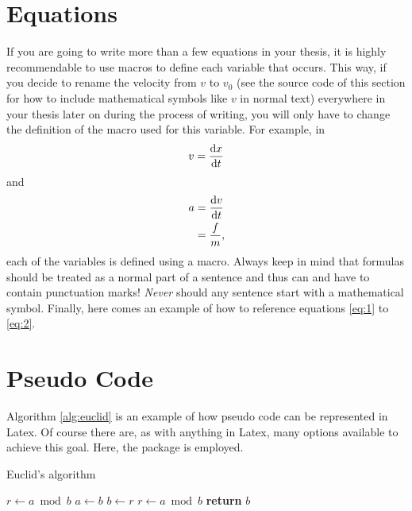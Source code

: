 \section{Equations}
If you are going to write more than a few equations in your thesis, it is highly recommendable to use macros to define each variable that occurs.
This way, if you decide to rename the velocity from $v$ to $v_0$ (see the source code of this section for how to include mathematical symbols like $v$ in normal text) everywhere in your thesis later on during the process of writing, you will only have to change the definition of the macro used for this variable.
For example, in
\begin{equation}
  \label{eq:1}
  v = \frac{\mathrm{d} x}{\mathrm{d} t}
\end{equation}
and
\begin{align}
  \label{eq:2}
  a &= \frac{\mathrm{d} v}{\mathrm{d} t} \nonumber \\
  &= \frac{f}{m},
\end{align}
each of the variables is defined using a macro.
Always keep in mind that formulas should be treated as a normal part of a sentence and thus can and have to contain punctuation marks!
\emph{Never} should any sentence start with a mathematical symbol.
Finally, here comes an example of how to reference equations \eqref{eq:1} to \eqref{eq:2}.

\section{Pseudo Code}
Algorithm \ref{alg:euclid} is an example of how pseudo code can be represented in Latex.
Of course there are, as with anything in Latex, many options available to achieve this goal.
Here, the  package is employed.
\begin{algorithm}
    \caption{Euclid's algorithm}
    \label{alg:euclid}
    \begin{algorithmic}[1] %
         
            \State $r\gets a \bmod b$
             
                \State $a \gets b$
                \State $b \gets r$
                \State $r \gets a \bmod b$
            \EndWhile\label{euclidendwhile}
            \State \textbf{return} $b$
        \EndProcedure
    \end{algorithmic}
\end{algorithm}





